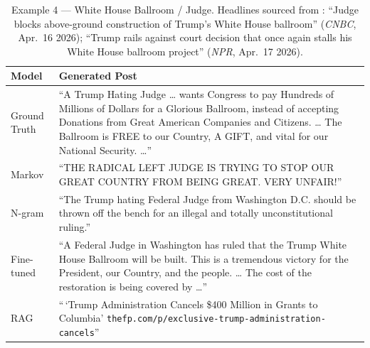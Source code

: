 \documentclass[11pt,a4paper]{article}
\begin{document}
\begin{table}[H]
\centering
\caption{Example 4 --- White House Ballroom / Judge. Headlines sourced from \citet{cnbc2026ballroom,npr2026ballroom}: ``Judge blocks above-ground construction of Trump's White House ballroom'' (\textit{CNBC}, Apr.\ 16 2026); ``Trump rails against court decision that once again stalls his White House ballroom project'' (\textit{NPR}, Apr.\ 17 2026).}
\label{tab:qual4}
\begin{tabular}{lp{9.5cm}}
\toprule
\textbf{Model} & \textbf{Generated Post} \\
\midrule
Ground Truth  & ``A Trump Hating Judge \ldots{} wants Congress to pay Hundreds of Millions of Dollars for a Glorious Ballroom, instead of accepting Donations from Great American Companies and Citizens. \ldots{} The Ballroom is FREE to our Country, A GIFT, and vital for our National Security. \ldots'' \\
\midrule
Markov        & ``THE RADICAL LEFT JUDGE IS TRYING TO STOP OUR GREAT COUNTRY FROM BEING GREAT. VERY UNFAIR!'' \\
N-gram        & ``The Trump hating Federal Judge from Washington D.C. should be thrown off the bench for an illegal and totally unconstitutional ruling.'' \\
Fine-tuned    & ``A Federal Judge in Washington has ruled that the Trump White House Ballroom will be built. This is a tremendous victory for the President, our Country, and the people. \ldots{} The cost of the restoration is being covered by \ldots'' \\
RAG           & ``\,`Trump Administration Cancels \$400 Million in Grants to Columbia' \texttt{thefp.com/p/exclusive-trump-administration-cancels}'' \\
\bottomrule
\end{tabular}
\end{table}
\end{document}
